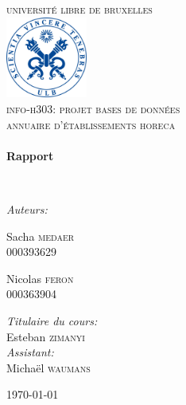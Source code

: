 \begin{titlepage}
\begin{center}


\textsc{\LARGE universit\'e libre de bruxelles}\\[1.5cm]

\includegraphics[width=0.2\textwidth]{ulb_logo.jpg}~\\[1cm]


\textsc{\Large info-h303: projet bases de données \\[0.3cm] annuaire d'établissements horeca}\\[0.5cm]

\HRule \\[0.4cm]
{ \huge \bfseries Rapport  \\[0.4cm] }

\HRule \\[1.5cm]
\noindent
\begin{center} \large
\emph{Auteurs:}\\
\end{center}
\begin{minipage}{0.4\textwidth}
\begin{flushleft} \large
Sacha \textsc{medaer}\\
000393629
\end{flushleft}
\end{minipage}
\begin{minipage}{0.4\textwidth}
\begin{flushright} \large
Nicolas \textsc{feron}\\
000363904
\end{flushright}
\end{minipage}
\linebreak
\linebreak
\begin{center} \large
\emph{Titulaire du cours:} \\
Esteban \textsc{zimanyi}\\
\emph{Assistant:} \\
Michaël \textsc{waumans}\\
\end{center}


\vfill

{\large \today}

\end{center}
\end{titlepage}